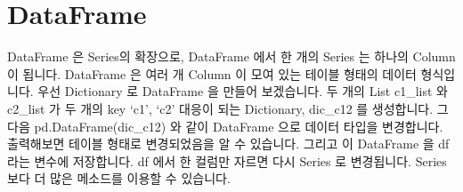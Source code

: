 \documentclass[letterpaper,10pt,english]{jupyterBook}
\begin{document}
\part{DataFrame}
\label{\detokenize{chapter2/2.1.1_Python_Basics:dataframe}}
\sphinxAtStartPar
DataFrame 은 Series의 확장으로, DataFrame 에서 한 개의 Series 는 하나의 Column 이 됩니다. DataFrame 은 여러 개 Column 이 모여 있는 테이블 형태의 데이터 형식입니다. 우선 Dictionary 로 DataFrame 을 만들어 보겠습니다. 두 개의 List \sphinxhyphen{} c1\_list 와 c2\_list 가 두 개의 key \sphinxhyphen{} ‘c1’, ‘c2’ 대응이 되는 Dictionary, dic\_c12 를 생성합니다. 그 다음 pd.DataFrame(dic\_c12) 와 같이 DataFrame 으로 데이터 타입을 변경합니다. 출력해보면 테이블 형태로 변경되었음을 알 수 있습니다. 그리고 이 DataFrame 을 df 라는 변수에 저장합니다. df 에서 한 컬럼만 자르면 다시 Series 로 변경됩니다. Series 보다 더 많은 메소드를 이용할 수 있습니다.
\end{document}
